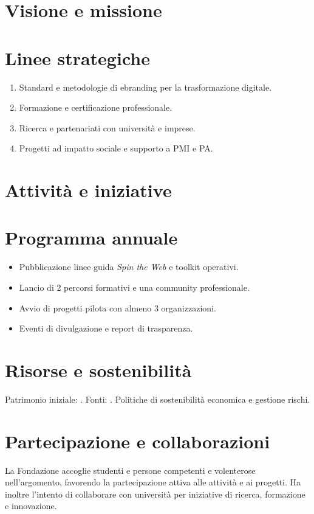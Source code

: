\maketitle

\section*{Visione e missione}
\FondazioneMissione

\section*{Linee strategiche}
\begin{enumerate}
  \item Standard e metodologie di ebranding per la trasformazione digitale.
  \item Formazione e certificazione professionale.
  \item Ricerca e partenariati con università e imprese.
  \item Progetti ad impatto sociale e supporto a PMI e PA.
\end{enumerate}

\section*{Attività e iniziative}
\FondazioneAttivita

\section*{Programma annuale}
\begin{itemize}
  \item Pubblicazione linee guida \emph{Spin the Web} e toolkit operativi.
  \item Lancio di 2 percorsi formativi e una community professionale.
  \item Avvio di progetti pilota con almeno 3 organizzazioni.
  \item Eventi di divulgazione e report di trasparenza.
\end{itemize}

\section*{Risorse e sostenibilità}
Patrimonio iniziale: \PatrimonioIniziale. Fonti: \FontiFinanziamento. Politiche di sostenibilità economica e gestione rischi.

\section*{Partecipazione e collaborazioni}
La Fondazione accoglie studenti e persone competenti e volenterose nell’argomento, favorendo la partecipazione attiva alle attività e ai progetti. Ha inoltre l’intento di collaborare con università per iniziative di ricerca, formazione e innovazione.

